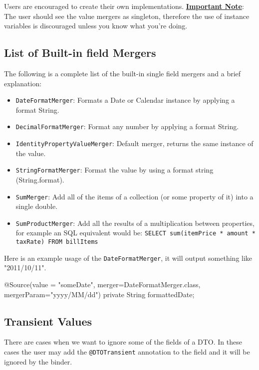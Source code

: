 \documentclass[11pt]{article}
\begin{document}
Users are encouraged to create their own implementations. \textbf{\underline{Important Note}}: The user should see
the value mergers as singleton, therefore the use of instance variables is discouraged unless you know what you're doing.


\subsection{List of Built-in field Mergers}


The following is a complete list of the built-in single field mergers and a brief explanation:

\begin{itemize}
 \item \texttt{DateFormatMerger}: Formats a Date or Calendar instance by applying a format String.
 \item \texttt{DecimalFormatMerger}: Format any number by applying a format String.
 \item \texttt{IdentityPropertyValueMerger}: Default merger, returns the same instance of the value.
 \item \texttt{StringFormatMerger}: Format the value by using a format string (String.format).
 \item \texttt{SumMerger}: Add all of the items of a collection (or some property of it) into a single double.
 \item \texttt{SumProductMerger}: Add all the results of a multiplication between properties, for example an SQL equivalent would be: \texttt{SELECT sum(itemPrice * amount * taxRate) FROM billItems }
\end{itemize}

Here is an example usage of the \texttt{DateFormatMerger}, it will output something like "2011/10/11".


\begin{java}
@Source(value = "someDate", 
    merger=DateFormatMerger.class, mergerParam="yyyy/MM/dd")
private String formattedDate;
\end{java}

\subsection{Transient Values}


There are cases when we want to ignore some of the fields of a DTO. In these cases the user may add the \texttt{@DTOTransient} annotation to the field and it will be ignored by the binder.
\end{document}
